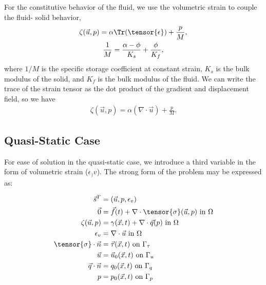 For the constitutive behavior of the fluid, we use the volumetric strain to couple the fluid-
solid behavior,
\begin{gather}
  \zeta(\vec{u},p) = \alpha \Tr({\tensor{\epsilon}}) + \frac{p}{M}, \\
%
  \frac{1}{M} = \frac{\alpha-\phi}{K_s} + \frac{\phi}{K_f},
\end{gather}
where $1/M$ is the specific storage coefficient at constant strain,
$K_s$ is the bulk modulus of the solid, and $K_f$ is the bulk modulus
of the fluid. We can write the trace of the strain tensor as the dot product of the gradient
and displacement
field, so we have
\begin{gather}
  \zeta(\vec{u},p) = \alpha (\nabla \cdot \vec{u}) + \frac{p}{M}.
\end{gather}





\subsection{Quasi-Static Case}


For ease of solution in the quasi-static case, we introduce a third variable in the form of volumetric strain ($\epsilon_){v}$).
The strong form of the problem may be expressed as:

\begin{align}
\vec{s}^{T} &= \left(\vec{u}, p, \epsilon_{v}\right) \\
\vec{0} &= \vec{f}(t) + \nabla \cdot \tensor{\sigma}(\vec{u},p) \text{ in } \Omega \\
\zeta(\vec{u},p) &= \gamma(\vec{x},t) + \nabla \cdot \vec{q}(p) \text{ in } \Omega \\
\epsilon_{v} &= \nabla \cdot \vec{u} \text{ in } \Omega \\
\tensor{\sigma} \cdot \vec{n} &= \vec{\tau}(\vec{x},t) \text{ on } \Gamma_{\tau} \\
\vec{u} &= \vec{u}_{0}(\vec{x}, t) \text{ on } \Gamma_{u} \\
\vec{q} \cdot \vec{n} &= q_{0}(\vec{x}, t) \text{ on } \Gamma_{q} \\
p &= p_{0}(\vec{x},t) \text{ on } \Gamma_{p}
\end{align}


